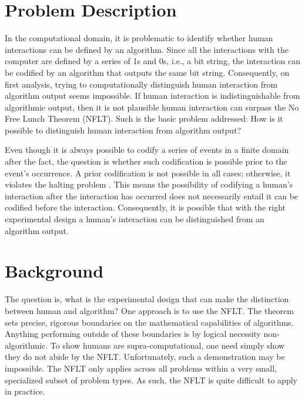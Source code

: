 \section{Problem Description}

In the computational domain, it is problematic to identify whether human interactions can be defined by an algorithm.  Since all the interactions with the computer are defined by a series of 1s and 0s, i.e., a bit string, the interaction can be codified by an algorithm that outputs the same bit string.  Consequently, on first analysis, trying to computationally distinguish human interaction from algorithm output seems impossible.  If human interaction is indistinguishable from algorithmic output, then it is not plausible human interaction can surpass the No Free Lunch Theorem (NFLT).  Such is the basic problem addressed: How is it possible to distinguish human interaction from algorithm output?

Even though it is always possible to codify a series of events in a finite domain after the fact, the question is whether such codification is possible prior to the event's occurrence.  A prior codification is not possible in all cases; otherwise, it violates the halting problem \citep{cover06:_elemen_of_infor_theor}.  This means the possibility of codifying a human's interaction after the interaction has occurred does not necessarily entail it can be codified before the interaction.  Consequently, it is possible that with the right experimental design a human's interaction can be distinguished from an algorithm output.

\section{Background}\label{sec:background}

The question is, what is the experimental design that can make the distinction between human and algorithm?  One approach is to use the NFLT.  The theorem sets precise, rigorous boundaries on the mathematical capabilities of algorithms. Anything performing outside of these boundaries is by logical necessity non-algorithmic.  To show humans are supra-computational, one need simply show they do not abide by the NFLT.  Unfortunately, such a demonstration may be impossible.  The NFLT only applies across all problems within a very small, specialized subset of problem types.  As such, the NFLT is quite difficult to apply in practice.

